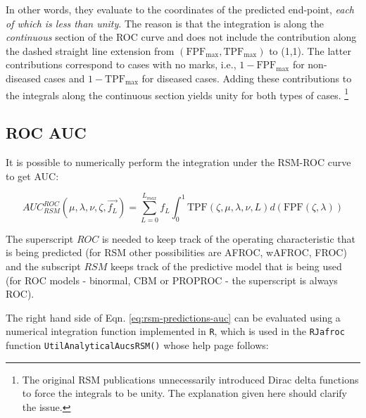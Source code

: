 \documentclass[
]{book}
\begin{document}
In other words, they evaluate to the coordinates of the predicted end-point, \emph{each of which is less than unity}. The reason is that the integration is along the \emph{continuous} section of the ROC curve and does not include the contribution along the dashed straight line extension from \(\left ( \text{FPF}_{\text{max}}, \text{TPF}_{\text{max}} \right )\) to (1,1). The latter contributions correspond to cases with no marks, i.e., \(1 - \text{FPF}_{\text{max}}\) for non-diseased cases and \(1 - \text{TPF}_{\text{max}}\) for diseased cases. Adding these contributions to the integrals along the continuous section yields unity for both types of cases. \footnote{The original RSM publications \citep{chakraborty2006search, chakraborty2006roc} unnecessarily introduced Dirac delta functions to force the integrals to be unity. The explanation given here should clarify the issue.}

\hypertarget{rsm-predictions-roc-curve-auc}{%
\subsection{ROC AUC}\label{rsm-predictions-roc-curve-auc}}

It is possible to numerically perform the integration under the RSM-ROC curve to get AUC:

\begin{equation}
AUC_{RSM}^{ROC}\left ( \mu, \lambda, \nu,  \zeta, \overrightarrow{f_L} \right ) = \sum_{L=0}^{L_{max}} f_L \int_{0}^{1} \text{TPF}\left (\zeta,  \mu, \lambda, \nu, L \right ) d\left ( \text{FPF}\left (\zeta, \lambda \right ) \right )
\label{eq:rsm-predictions-auc}
\end{equation}

The superscript \(ROC\) is needed to keep track of the operating characteristic that is being predicted (for RSM other possibilities are AFROC, wAFROC, FROC) and the subscript \(RSM\) keeps track of the predictive model that is being used (for ROC models - binormal, CBM or PROPROC - the superscript is always ROC).

The right hand side of Eqn. \eqref{eq:rsm-predictions-auc} can be evaluated using a numerical integration function implemented in \texttt{R}, which is used in the \texttt{RJafroc} function \texttt{UtilAnalyticalAucsRSM()} whose help page follows:
\end{document}
